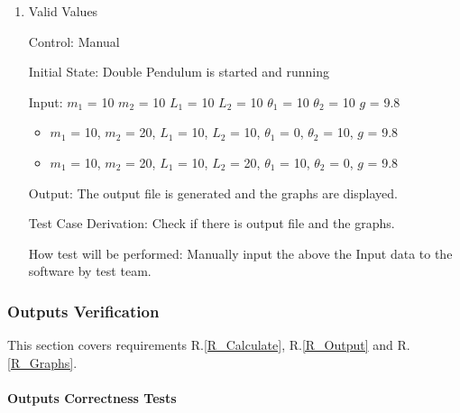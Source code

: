 \documentclass[12pt, titlepage]{article}
\begin{document}
\begin{enumerate}
          
\item{Valid Values}

Control: Manual
          
Initial State: Double Pendulum is started and running
          
Input: $m_1$ = 10 $m_2$ = 10 $L_1$ = 10 $L_2$ = 10 $\theta_1$ = 10 $\theta_2$ =
10 $g$ = 9.8 
\begin{itemize}
\item $m_1$ = 10, $m_2$ = 20, $L_1$ = 10, $L_2$ = 10, $\theta_1$ = 0, $\theta_2$ = 10, $g$ = 9.8
\item $m_1$ = 10, $m_2$ = 20, $L_1$ = 10, $L_2$ = 20, $\theta_1$ = 10, $\theta_2$ = 0, $g$ = 9.8

\end{itemize}

Output: The output file is generated and the graphs are displayed.

Test Case Derivation: Check if there is output file and the graphs.

How test will be performed: Manually input the above the Input data to the
software by test team.

\end{enumerate}

\subsubsection{Outputs Verification}\label{VRF_Output}

This section covers requirements R.\ref{R_Calculate}, R.\ref{R_Output} and
R.\ref{R_Graphs}.

\paragraph{Outputs Correctness Tests}
\end{document}
